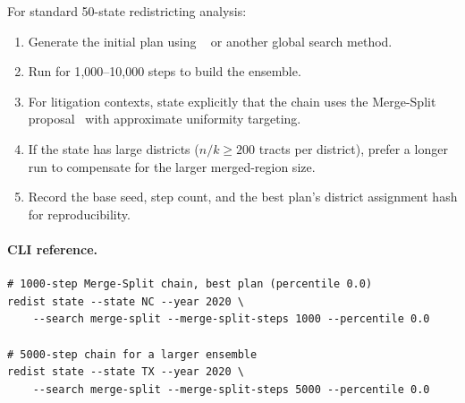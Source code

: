 For standard 50-state redistricting analysis:

\begin{enumerate}
  \item Generate the initial plan using \cs{}~\citep{b11paper} or
        another global search method.
  \item Run \mergesplit{} for 1{,}000--10{,}000 steps to build the
        ensemble.
  \item For litigation contexts, state explicitly that the chain uses the
        Merge-Split proposal~\citep{janson2022} with approximate
        uniformity targeting.
  \item If the state has large districts ($n/k \geq 200$ tracts per
        district), prefer a longer run to compensate for the larger
        merged-region size.
  \item Record the base seed, step count, and the best plan's district
        assignment hash for reproducibility.
\end{enumerate}

\paragraph{CLI reference.}
\begin{verbatim}
# 1000-step Merge-Split chain, best plan (percentile 0.0)
redist state --state NC --year 2020 \
    --search merge-split --merge-split-steps 1000 --percentile 0.0

# 5000-step chain for a larger ensemble
redist state --state TX --year 2020 \
    --search merge-split --merge-split-steps 5000 --percentile 0.0
\end{verbatim}
